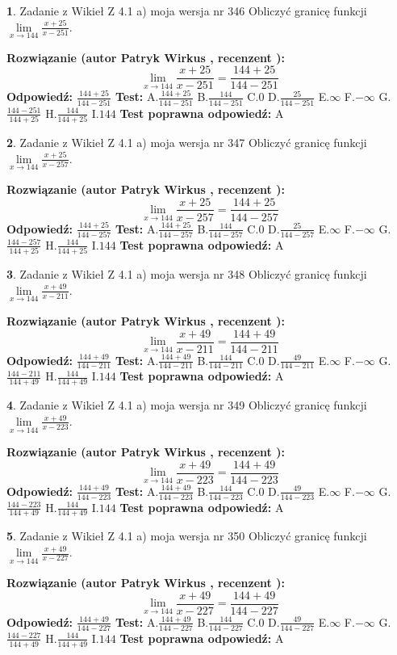 \documentclass[12pt, a4paper]{article}
\theoremstyle{definition} %
\newtheorem{zad}{}
\newcommand{\zadStart}[1]{\begin{zad}#1\newline}
\newcommand{\zadStop}{\end{zad}}
\newcommand{\rozwStart}[2]{\noindent \textbf{Rozwiązanie (autor #1 , recenzent #2): }\newline}
\newcommand{\rozwStop}{\newline}
\newcommand{\odpStart}{\noindent \textbf{Odpowiedź:}\newline}
\newcommand{\odpStop}{\newline}
\newcommand{\testStart}{\noindent \textbf{Test:}\newline}
\newcommand{\testStop}{\newline}
\newcommand{\kluczStart}{\noindent \textbf{Test poprawna odpowiedź:}\newline}
\newcommand{\kluczStop}{\newline}
\begin{document}
\zadStart{Zadanie z Wikieł Z 4.1 a) moja wersja nr 346}
Obliczyć granicę funkcji $\lim\limits_{x\to144}\frac{x+25}{x-251}$.
\zadStop
\rozwStart{Patryk Wirkus}{}
$$\lim\limits_{x\to144}\frac{x+25}{x-251} = \frac{144+25}{144-251}$$
\rozwStop
\odpStart
$\frac{144+25}{144-251}$
\odpStop
\testStart
A.$\frac{144+25}{144-251}$
B.$\frac{144}{144-251}$
C.$0$
D.$\frac{25}{144-251}$
E.$\infty$
F.$-\infty$
G.$\frac{144-251}{144+25}$
H.$\frac{144}{144+25}$
I.$144$
\testStop
\kluczStart
A
\kluczStop



\zadStart{Zadanie z Wikieł Z 4.1 a) moja wersja nr 347}
Obliczyć granicę funkcji $\lim\limits_{x\to144}\frac{x+25}{x-257}$.
\zadStop
\rozwStart{Patryk Wirkus}{}
$$\lim\limits_{x\to144}\frac{x+25}{x-257} = \frac{144+25}{144-257}$$
\rozwStop
\odpStart
$\frac{144+25}{144-257}$
\odpStop
\testStart
A.$\frac{144+25}{144-257}$
B.$\frac{144}{144-257}$
C.$0$
D.$\frac{25}{144-257}$
E.$\infty$
F.$-\infty$
G.$\frac{144-257}{144+25}$
H.$\frac{144}{144+25}$
I.$144$
\testStop
\kluczStart
A
\kluczStop



\zadStart{Zadanie z Wikieł Z 4.1 a) moja wersja nr 348}
Obliczyć granicę funkcji $\lim\limits_{x\to144}\frac{x+49}{x-211}$.
\zadStop
\rozwStart{Patryk Wirkus}{}
$$\lim\limits_{x\to144}\frac{x+49}{x-211} = \frac{144+49}{144-211}$$
\rozwStop
\odpStart
$\frac{144+49}{144-211}$
\odpStop
\testStart
A.$\frac{144+49}{144-211}$
B.$\frac{144}{144-211}$
C.$0$
D.$\frac{49}{144-211}$
E.$\infty$
F.$-\infty$
G.$\frac{144-211}{144+49}$
H.$\frac{144}{144+49}$
I.$144$
\testStop
\kluczStart
A
\kluczStop



\zadStart{Zadanie z Wikieł Z 4.1 a) moja wersja nr 349}
Obliczyć granicę funkcji $\lim\limits_{x\to144}\frac{x+49}{x-223}$.
\zadStop
\rozwStart{Patryk Wirkus}{}
$$\lim\limits_{x\to144}\frac{x+49}{x-223} = \frac{144+49}{144-223}$$
\rozwStop
\odpStart
$\frac{144+49}{144-223}$
\odpStop
\testStart
A.$\frac{144+49}{144-223}$
B.$\frac{144}{144-223}$
C.$0$
D.$\frac{49}{144-223}$
E.$\infty$
F.$-\infty$
G.$\frac{144-223}{144+49}$
H.$\frac{144}{144+49}$
I.$144$
\testStop
\kluczStart
A
\kluczStop



\zadStart{Zadanie z Wikieł Z 4.1 a) moja wersja nr 350}
Obliczyć granicę funkcji $\lim\limits_{x\to144}\frac{x+49}{x-227}$.
\zadStop
\rozwStart{Patryk Wirkus}{}
$$\lim\limits_{x\to144}\frac{x+49}{x-227} = \frac{144+49}{144-227}$$
\rozwStop
\odpStart
$\frac{144+49}{144-227}$
\odpStop
\testStart
A.$\frac{144+49}{144-227}$
B.$\frac{144}{144-227}$
C.$0$
D.$\frac{49}{144-227}$
E.$\infty$
F.$-\infty$
G.$\frac{144-227}{144+49}$
H.$\frac{144}{144+49}$
I.$144$
\testStop
\kluczStart
A
\kluczStop
\end{document}
